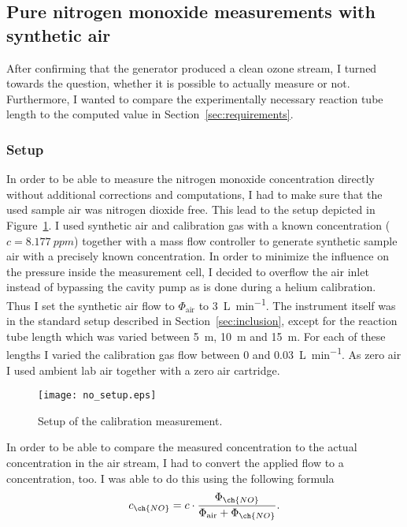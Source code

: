 \subsection{Pure nitrogen monoxide measurements with synthetic air}
\label{sec:no}

After confirming that the generator produced a clean ozone stream, I
turned towards the question, whether it is possible to actually
measure  or not. Furthermore, I wanted to compare the
experimentally necessary reaction tube length to the computed value in
Section~\ref{sec:requirements}.

\subsubsection{Setup}
\label{sec:no-setup}

In order to be able to measure the nitrogen monoxide concentration
directly without additional corrections and computations, I had to
make sure that the used sample air was nitrogen dioxide free. This
lead to the setup depicted in Figure~\ref{fig:no-setup}. I used
synthetic air and  calibration gas with a known 
concentration ($c = \SI{8.177}{ppm}$) together with a mass flow
controller to generate synthetic sample air with a precisely known
 concentration. In order to minimize the influence on the
pressure inside the measurement cell, I decided to overflow the air inlet
instead of bypassing the cavity pump as is done during a helium
calibration. Thus I set the synthetic air flow to $\Phi_{\text{air}}$
to \SI{3}{\liter\per\minute}. The instrument itself was in the standard
setup described in Section~\ref{sec:inclusion}, except for the
reaction tube length which was varied between \SI{5}{\meter},
\SI{10}{\meter} and \SI{15}{\meter}. For each of these lengths I
varied the  calibration gas flow between \num{0} and
\SI{0.03}{\liter\per\minute}. As zero air I used ambient lab air
together with a zero air cartridge.

\begin{figure}[htbp]
  \centering
  \texttt{[image: no\_setup.eps]}
  \caption{Setup of the calibration measurement.}
  \label{fig:no-setup}
\end{figure}

In order to be able to compare the measured  concentration to the
actual concentration in the air stream, I had to convert the applied
 flow to a concentration, too. I was able to do this using the
following formula
\begin{align}
  c_{\ch{NO}} = c \cdot \frac{\Phi_{\ch{NO}}}{\Phi_{\text{air}} +
  \Phi_{\ch{NO}}}. \label{eq:c-flow}
\end{align}

